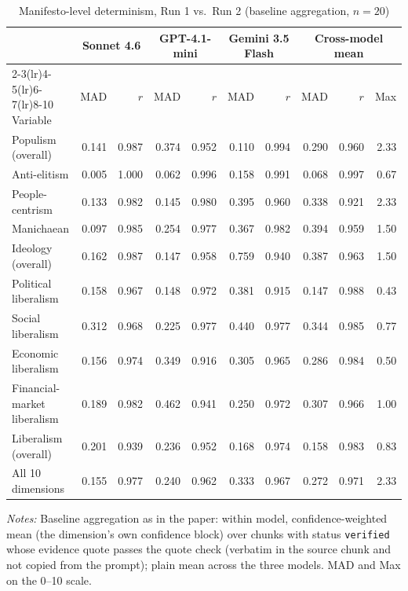 \begin{table}[ht]
\centering
\caption{Manifesto-level determinism, Run 1 vs.\ Run 2 (baseline aggregation, $n=20$)}
\label{tab:verify_manifesto}
\scriptsize
\begin{tabular}{lrrrrrrrrr}
\toprule
 & \multicolumn{2}{c}{Sonnet 4.6} & \multicolumn{2}{c}{GPT-4.1-mini} & \multicolumn{2}{c}{Gemini 3.5 Flash} & \multicolumn{3}{c}{Cross-model mean} \\
\cmidrule(lr){2-3}\cmidrule(lr){4-5}\cmidrule(lr){6-7}\cmidrule(lr){8-10}
Variable & MAD & $r$ & MAD & $r$ & MAD & $r$ & MAD & $r$ & Max \\
\midrule
Populism (overall) & 0.141 & 0.987 & 0.374 & 0.952 & 0.110 & 0.994 & 0.290 & 0.960 & 2.33 \\
Anti-elitism & 0.005 & 1.000 & 0.062 & 0.996 & 0.158 & 0.991 & 0.068 & 0.997 & 0.67 \\
People-centrism & 0.133 & 0.982 & 0.145 & 0.980 & 0.395 & 0.960 & 0.338 & 0.921 & 2.33 \\
Manichaean & 0.097 & 0.985 & 0.254 & 0.977 & 0.367 & 0.982 & 0.394 & 0.959 & 1.50 \\
Ideology (overall) & 0.162 & 0.987 & 0.147 & 0.958 & 0.759 & 0.940 & 0.387 & 0.963 & 1.50 \\
Political liberalism & 0.158 & 0.967 & 0.148 & 0.972 & 0.381 & 0.915 & 0.147 & 0.988 & 0.43 \\
Social liberalism & 0.312 & 0.968 & 0.225 & 0.977 & 0.440 & 0.977 & 0.344 & 0.985 & 0.77 \\
Economic liberalism & 0.156 & 0.974 & 0.349 & 0.916 & 0.305 & 0.965 & 0.286 & 0.984 & 0.50 \\
Financial-market liberalism & 0.189 & 0.982 & 0.462 & 0.941 & 0.250 & 0.972 & 0.307 & 0.966 & 1.00 \\
Liberalism (overall) & 0.201 & 0.939 & 0.236 & 0.952 & 0.168 & 0.974 & 0.158 & 0.983 & 0.83 \\
\midrule
All 10 dimensions & 0.155 & 0.977 & 0.240 & 0.962 & 0.333 & 0.967 & 0.272 & 0.971 & 2.33 \\
\bottomrule
\end{tabular}
\par\smallskip\parbox{0.95\linewidth}{\scriptsize\textit{Notes:} Baseline aggregation as in the paper: within model, confidence-weighted mean (the dimension's own confidence block) over chunks with status \texttt{verified} whose evidence quote passes the quote check (verbatim in the source chunk and not copied from the prompt); plain mean across the three models. MAD and Max on the 0--10 scale.}
\end{table}
